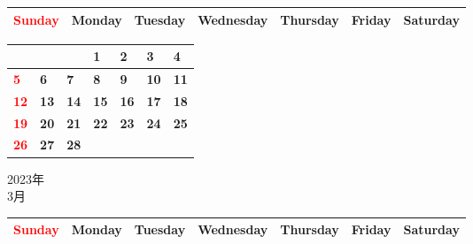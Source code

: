 \documentclass[a4paper,landscape]{jsarticle}
\newcommand{\dig}{\hspace{29mm}}
\newcommand{\tdig}{\hspace{27mm}}
\newcommand{\LBF}{\LARGE\textbf}
\begin{document}
\begingroup
\renewcommand{\arraystretch}{1.4}
\begin{tabular}{|>{\centering\arraybackslash}p{32mm}|>{\centering\arraybackslash}p{32mm}|>{\centering\arraybackslash}p{32mm}|>{\centering\arraybackslash}p{32mm}|>{\centering\arraybackslash}p{32mm}|>{\centering\arraybackslash}p{32mm}|>{\centering\arraybackslash}p{32mm}|}
\hline
\textcolor{red}{\large Sunday}&\large Monday&\large Tuesday&\large Wednesday&\large Thursday&\large Friday&\large Saturday\\
\hline
\end{tabular}
\endgroup

\begingroup
\renewcommand{\arraystretch}{4}
\begin{tabular}{|p{32mm}|p{32mm}|p{32mm}|p{32mm}|p{32mm}|p{32mm}|p{32mm}|}
\hline
&&&\raisebox{30pt} {\dig\LBF{1}}&\raisebox{30pt} {\dig\LBF{2}}&\raisebox{30pt} {\dig\LBF{3}}&\raisebox{30pt} {\dig\LBF{4}}\\
\hline
\raisebox{30pt} {\dig\textcolor{red}{\LBF{5}}}&\raisebox{30pt} {\dig\LBF{6}}&\raisebox{30pt} {\dig\LBF{7}}&\raisebox{30pt} {\dig\LBF{8}}&\raisebox{30pt} {\dig\LBF{9}}&\raisebox{30pt} {\tdig\LBF{10}}&\raisebox{30pt} {\tdig\LBF{11}}\\
\hline
\raisebox{30pt} {\tdig\textcolor{red}{\LBF{12}}}&\raisebox{30pt} {\tdig\LBF{13}}&\raisebox{30pt} {\tdig\LBF{14}}&\raisebox{30pt} {\tdig\LBF{15}}&\raisebox{30pt} {\tdig\LBF{16}}&\raisebox{30pt} {\tdig\LBF{17}}&\raisebox{30pt} {\tdig\LBF{18}}\\
\hline
\raisebox{30pt} {\tdig\textcolor{red}{\LBF{19}}}&\raisebox{30pt} {\tdig\LBF{20}}&\raisebox{30pt} {\tdig\LBF{21}}&\raisebox{30pt} {\tdig\LBF{22}}&\raisebox{30pt} {\tdig\LBF{23}}&\raisebox{30pt} {\tdig\LBF{24}}&\raisebox{30pt} {\tdig\LBF{25}}\\
\hline
\raisebox{30pt} {\tdig\textcolor{red}{\LBF{26}}}&\raisebox{30pt} {\tdig\LBF{27}}&\raisebox{30pt} {\tdig\LBF{28}}&&&&\\
\hline
\end{tabular}
\endgroup

\newpage

\begin{center}
	\LARGE 2023年\\
	\LARGE 3月
\end{center}

\begingroup
\renewcommand{\arraystretch}{1.4}
\begin{tabular}{|>{\centering\arraybackslash}p{32mm}|>{\centering\arraybackslash}p{32mm}|>{\centering\arraybackslash}p{32mm}|>{\centering\arraybackslash}p{32mm}|>{\centering\arraybackslash}p{32mm}|>{\centering\arraybackslash}p{32mm}|>{\centering\arraybackslash}p{32mm}|}
\hline
\textcolor{red}{\large Sunday}&\large Monday&\large Tuesday&\large Wednesday&\large Thursday&\large Friday&\large Saturday\\
\hline
\end{tabular}
\endgroup
\end{document}
